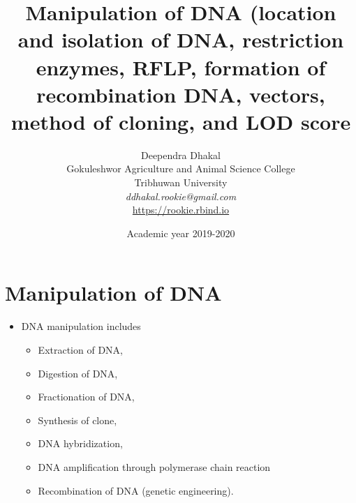 \documentclass[11pt,dvipsnames,ignorenonframetext,aspectratio=169]{beamer}
\title[]{Manipulation of DNA (location and isolation of DNA, restriction enzymes,
RFLP, formation of recombination DNA, vectors, method of cloning, and
LOD score}
\author[
        Deependra Dhakal\\
Gokuleshwor Agriculture and Animal Science College\\
Tribhuwan University\\
\textit{ddhakal.rookie@gmail.com}\\
\url{https://rookie.rbind.io}
    ]{Deependra Dhakal\\
Gokuleshwor Agriculture and Animal Science College\\
Tribhuwan University\\
\textit{ddhakal.rookie@gmail.com}\\
\url{https://rookie.rbind.io}}
\date[
      Academic year 2019-2020
  ]{
      Academic year 2019-2020
        }
\providecommand{\tightlist}{%
  \setlength{\itemsep}{0pt}\setlength{\parskip}{0pt}}
\begin{document}
  \begin{frame}[plain]
  \titlepage
  \end{frame}



\hypertarget{manipulation-of-dna}{%
\section{Manipulation of DNA}\label{manipulation-of-dna}}

\begin{frame}{}
\protect\hypertarget{section}{}

\begin{itemize}
\tightlist
\item
  DNA manipulation includes

  \begin{itemize}
  \tightlist
  \item
    Extraction of DNA,
  \item
    Digestion of DNA,
  \item
    Fractionation of DNA,
  \item
    Synthesis of clone,
  \item
    DNA hybridization,
  \item
    DNA amplification through polymerase chain reaction
  \item
    Recombination of DNA (genetic engineering).
  \end{itemize}
\end{itemize}

\end{frame}
\end{document}
